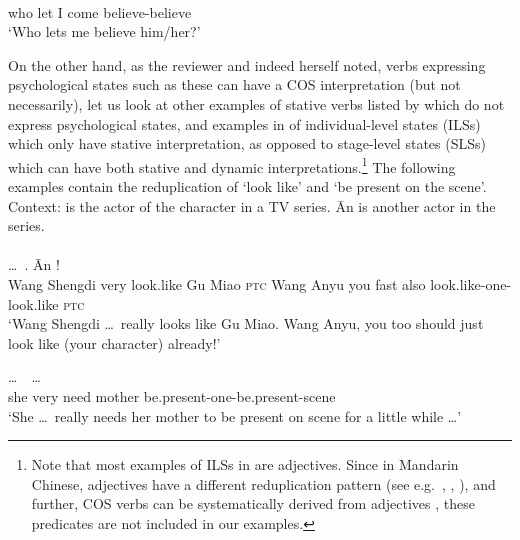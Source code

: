 \ex\label{ex:xiangxin}%
\gll {}    \\
who let I come believe-believe\\
\glt `Who lets me believe him/her?'
\z

On the other hand, as the reviewer %
and indeed \citet[669--670]{Tham2013} herself noted,
verbs expressing psychological states such as these can have a COS interpretation (but not necessarily),
let us look at other examples of stative verbs listed by \citet[680]{PeckEtAl2013} which do not express psychological states,
and examples in  \citet[Sec. 3.3.3]{XiaoMcEnery2004} of individual-level states (ILSs) which only have stative interpretation,
as opposed to stage-level states (SLSs) which can have both stative and dynamic interpretations.\footnote{
    Note that most examples of ILSs in \citet[Sec. 3.3.3]{XiaoMcEnery2004} are adjectives.
    Since in Mandarin Chinese, adjectives have a different reduplication pattern (see e.g.\ \citealt[Sec. 2.2]{Tsao2001}, \citealt[Sec. 4.1]{FanSongBond2015}, \citealt[Sec. 3]{Sui2018}),
    and further, COS verbs can be systematically derived from adjectives \citep[Sec. 3]{Tham2013},
    these predicates are not included in our examples.}
The following examples contain the reduplication of  `look like' and  `be present on the scene'.
\ea\label{ex:xiang}%
Context:   is the actor of the character   in a TV series.
 Ān is another actor in the series.\\
\\
\gll {}  \ldots\,     .  Ān     !\footnotemark\\
Wang Shengdi {} very look.like Gu Miao \textsc{ptc} Wang Anyu you fast also look.like-one-look.like \textsc{ptc}\\
\glt `Wang Shengdi \ldots\,  really looks like Gu Miao. Wang Anyu, you too should just look like (your character) already!'

\ex\label{ex:zaichang}%
\gll {} \ldots\,    ~\ldots\\
she {} very need mother be.present-one-be.present-scene\\
\glt `She \ldots\, really needs her mother to be present on scene for a little while \ldots'
\z
{}

